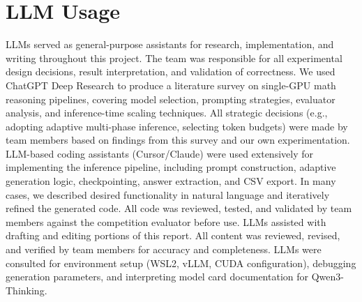 \documentclass{article}
\begin{document}
\section{LLM Usage}
LLMs served as general-purpose assistants for research, implementation, and writing throughout this project. The team was responsible for all experimental design decisions, result interpretation, and validation of correctness. We used ChatGPT Deep Research to produce a literature survey on single-GPU math reasoning pipelines, covering model selection, prompting strategies, evaluator analysis, and inference-time scaling techniques. All strategic decisions (e.g., adopting adaptive multi-phase inference, selecting token budgets) were made by team members based on findings from this survey and our own experimentation. LLM-based coding assistants (Cursor/Claude) were used extensively for implementing the inference pipeline, including prompt construction, adaptive generation logic, checkpointing, answer extraction, and CSV export. In many cases, we described desired functionality in natural language and iteratively refined the generated code. All code was reviewed, tested, and validated by team members against the competition evaluator before use. LLMs assisted with drafting and editing portions of this report. All content was reviewed, revised, and verified by team members for accuracy and completeness. LLMs were consulted for environment setup (WSL2, vLLM, CUDA configuration), debugging generation parameters, and interpreting model card documentation for Qwen3-Thinking.


% 
% 
\end{document}
